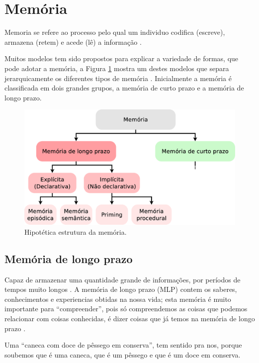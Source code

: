 \section{Memória}
\label{sec:memoria}

Memoria se refere ao processo pelo qual um individuo codifica (escreve), 
armazena (retem) e acede (lê) a informação
\cite[pp. 678]{spreen2006compendium} \cite[pp. 31]{de2000comprension}.

Muitos modelos tem sido propostos para explicar a variedade de formas, 
que pode adotar a memória, a Figura \ref{fig:memory-clasification}  mostra um destes modelos
que separa jerarquicamente os diferentes tipos de memória
\cite[pp. 678]{spreen2006compendium}.
Inicialmente a memória é classificada em dois grandes grupos,
a memória de curto prazo e a memória de longo prazo.
\begin{figure}[!h]
  \centering
    \includegraphics[width=\textwidth]{chapters/cap-learning/memory-clasification.eps} 
  \caption{Hipotética estrutura da memória.}
\label{fig:memory-clasification}
\end{figure}


\subsection{Memória de longo prazo} 
\label{sec:memoria:longo}
Capaz de armazenar uma quantidade grande de informações, 
por períodos de tempos muito longos \cite[pp. 158]{sternbergpsicologia}.
A memória de longo prazo (MLP) contem os saberes, conhecimentos e experiencias obtidas na nossa vida;
esta memória é muito importante para ``compreender'',
pois só compreendemos as coisas que podemos relacionar com coisas conhecidas,
é dizer coisas que já temos na memória de longo prazo \cite[pp. 34]{de2000comprension}.
\begin{example}
Uma ``caneca com doce de pêssego em conserva'', tem sentido pra nos,
porque soubemos que é uma caneca, que é um pêssego e que é um doce em conserva.
\end{example} 


